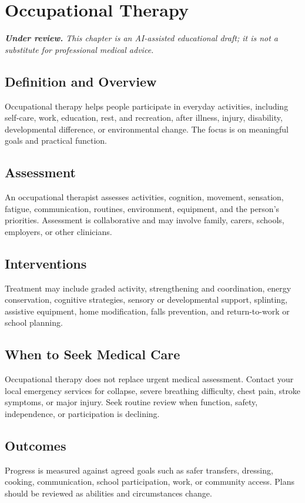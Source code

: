 \chapter{Occupational Therapy}

\medskip
\noindent\textit{\textbf{Under review.} This chapter is an AI-assisted educational draft; it is not a substitute for professional medical advice.}

\section*{Definition and Overview}
Occupational therapy helps people participate in everyday activities, including self-care, work, education, rest, and recreation, after illness, injury, disability, developmental difference, or environmental change. The focus is on meaningful goals and practical function.

\section*{Assessment}
An occupational therapist assesses activities, cognition, movement, sensation, fatigue, communication, routines, environment, equipment, and the person's priorities. Assessment is collaborative and may involve family, carers, schools, employers, or other clinicians.

\section*{Interventions}
Treatment may include graded activity, strengthening and coordination, energy conservation, cognitive strategies, sensory or developmental support, splinting, assistive equipment, home modification, falls prevention, and return-to-work or school planning.

\section*{When to Seek Medical Care}
Occupational therapy does not replace urgent medical assessment. Contact your local emergency services for collapse, severe breathing difficulty, chest pain, stroke symptoms, or major injury. Seek routine review when function, safety, independence, or participation is declining.

\section*{Outcomes}
Progress is measured against agreed goals such as safer transfers, dressing, cooking, communication, school participation, work, or community access. Plans should be reviewed as abilities and circumstances change.

